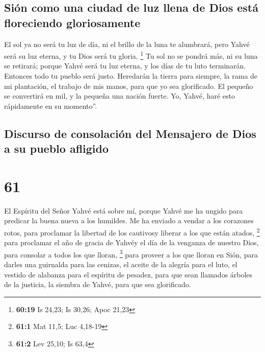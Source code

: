 \hypertarget{siuxf3n-como-una-ciudad-de-luz-llena-de-dios-estuxe1-floreciendo-gloriosamente}{%
\subsection{Sión como una ciudad de luz llena de Dios está floreciendo
gloriosamente}\label{siuxf3n-como-una-ciudad-de-luz-llena-de-dios-estuxe1-floreciendo-gloriosamente}}

 El sol ya no será tu luz de día, ni el brillo de la luna
te alumbrará, pero Yahvé será su luz eterna, y tu Dios será tu gloria.
\footnote{\textbf{60:19} Is 24,23; Is 30,26; Apoc 21,23} 
Tu sol no se pondrá más, ni su luna se retirará; porque Yahvé será tu
luz eterna, y los días de tu luto terminarán.  Entonces
todo tu pueblo será justo. Heredarán la tierra para siempre, la rama de
mi plantación, el trabajo de mis manos, para que yo sea glorificado.
 El pequeño se convertirá en mil, y la pequeña una nación
fuerte. Yo, Yahvé, haré esto rápidamente en su momento''.

\hypertarget{discurso-de-consolaciuxf3n-del-mensajero-de-dios-a-su-pueblo-afligido}{%
\subsection{Discurso de consolación del Mensajero de Dios a su pueblo
afligido}\label{discurso-de-consolaciuxf3n-del-mensajero-de-dios-a-su-pueblo-afligido}}

\hypertarget{section-60}{%
\section{61}\label{section-60}}

 El Espíritu del Señor Yahvé está sobre mí, porque Yahvé
me ha ungido para predicar la buena nueva a los humildes. Me ha enviado
a vendar a los corazones rotos, para proclamar la libertad de los
cautivosy liberar a los que están atados, \footnote{\textbf{61:1} Mat
  11,5; Luc 4,18-19}  para proclamar el año de gracia de
Yahvéy el día de la venganza de nuestro Dios, para consolar a todos los
que lloran, \footnote{\textbf{61:2} Lev 25,10; Is 63,4} 
para proveer a los que lloran en Sión, para darles una guirnalda para
las cenizas, el aceite de la alegría para el luto, el vestido de
alabanza para el espíritu de pesadez, para que sean llamados árboles de
la justicia, la siembra de Yahvé, para que sea glorificado.

